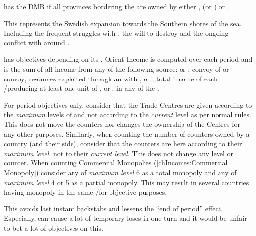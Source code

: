  \SUE has the DMB if all provinces
bordering the  are owned by either \SUE,
 (or \PRU) or .

\begin{histoire}
  This represents the Swedish expansion towards the Southern shores of
  the sea. Including the frequent struggles with \POL, the will to
  destroy \paysHanse and the ongoing conflict with \RUS around
  \provinceIngria.
\end{histoire}

 \VEN has objectives depending on its
. Orient Income is computed over each period and is
the sum of all income from any of the following source:
\bparag {} or ; 
\bparag convoy of  or  convoy;
\bparag resources exploited through an \dipAT with \paysaden, \paysoman
or \paysgujarat;
\bparag total income of each \COL/\TP producing at least one unit of
,  or ;
\bparag \TradeFLEET in any \CTZ of the .

For period objectives only, consider that the Trade Centres are given
according to the \emph{maximum} levels of \TradeFLEET and not according
to the \emph{current} level as per normal rules.
\bparag This does not move the counters nor changes the ownership of the
Centres for any other purposes.
\bparag Similarly, when counting the number of \TradeFLEET counters
owned by a country (and their side), consider that the counters are here
according to their \emph{maximum level}, not to their \emph{current
  level}. This does not change any \TradeFLEET level or counter.
\bparag When counting Commercial Monopolies (\ref{chIncomes:Commercial
  Monopoly}) consider any \TradeFLEET of \emph{maximum level} 6 as a
total monopoly and any \TradeFLEET of \emph{maximum level} 4 or 5 as a
partial monopoly. This may result in several countries having monopoly
in the same \CTZ/\STZ for objective purposes.

\begin{designnote}
  This avoids last instant backstabs and lessens the ``end of period''
  effect. Especially, \corsaire can cause a lot of temporary loses in
  one turn and it would be unfair to bet a lot of objectives \VPs on
  this.
\end{designnote}

